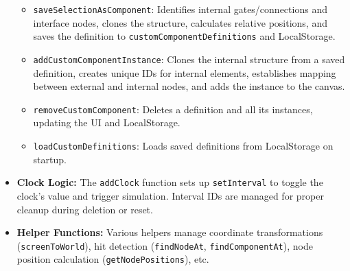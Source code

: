 \documentclass[11pt, a4paper]{article}
\begin{document}
\begin{itemize}
        \begin{itemize}
             \item \texttt{saveSelectionAsComponent}: Identifies internal gates/connections and interface nodes, clones the structure, calculates relative positions, and saves the definition to \texttt{customComponentDefinitions} and LocalStorage.
             \item \texttt{addCustomComponentInstance}: Clones the internal structure from a saved definition, creates unique IDs for internal elements, establishes mapping between external and internal nodes, and adds the instance to the canvas.
             \item \texttt{removeCustomComponent}: Deletes a definition and all its instances, updating the UI and LocalStorage.
             \item \texttt{loadCustomDefinitions}: Loads saved definitions from LocalStorage on startup.
        \end{itemize}
    \item \textbf{Clock Logic:} The \texttt{addClock} function sets up \texttt{setInterval} to toggle the clock's value and trigger simulation. Interval IDs are managed for proper cleanup during deletion or reset.
    \item \textbf{Helper Functions:} Various helpers manage coordinate transformations (\texttt{screenToWorld}), hit detection (\texttt{findNodeAt}, \texttt{findComponentAt}), node position calculation (\texttt{getNodePositions}), etc.
\end{itemize}

\end{document}
